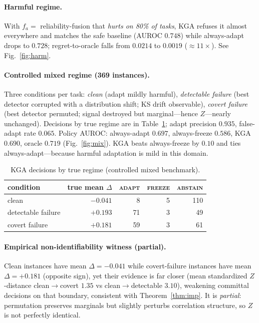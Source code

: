 \documentclass[conference]{IEEEtran}
\theoremstyle{plain}
\theoremstyle{definition}
\begin{document}
\paragraph{Harmful regime.} With $f_a=$ reliability-fusion that \emph{hurts on 80\% of
tasks}, \textsc{KGA} refuses it almost everywhere and matches the safe baseline
(AUROC $0.748$) while always-adapt drops to $0.728$; regret-to-oracle falls from
$0.0214$ to $0.0019$ ($\approx11\times$). See Fig.~\ref{fig:harm}.

\paragraph{Controlled mixed regime (369 instances).} Three conditions per task:
\emph{clean} (adapt mildly harmful), \emph{detectable failure} (best detector
corrupted with a distribution shift; KS drift observable), \emph{covert failure} (best
detector permuted; signal destroyed but marginal---hence $Z$---nearly unchanged).
Decisions by true regime are in Table~\ref{tab:mixed}; adapt precision $0.935$,
false-adapt rate $0.065$. Policy AUROC: always-adapt $0.697$, always-freeze $0.586$,
\textsc{KGA} $0.690$, oracle $0.719$ (Fig.~\ref{fig:mix}). \textsc{KGA} beats
always-freeze by $0.10$ and ties always-adapt---because harmful adaptation is mild in
this domain.

\begin{table}[t]\centering
\begin{tabular}{lrrrr}
\toprule
condition & true mean $\Delta$ & \textsc{adapt} & \textsc{freeze} & \textsc{abstain}\\
\midrule
clean & $-0.041$ & 8 & 5 & 110\\
detectable failure & $+0.193$ & 71 & 3 & 49\\
covert failure & $+0.181$ & 59 & 3 & 61\\
\bottomrule
\end{tabular}
\caption{\textsc{KGA} decisions by true regime (controlled mixed benchmark).}
\label{tab:mixed}
\end{table}

\paragraph{Empirical non-identifiability witness (partial).} Clean instances have mean
$\Delta=-0.041$ while covert-failure instances have mean $\Delta=+0.181$ (opposite
sign), yet their evidence is far closer (mean standardized $Z$-distance clean$\to$covert
$1.35$ vs clean$\to$detectable $3.10$), weakening committal decisions on that boundary,
consistent with Theorem~\ref{thm:imp}. It is \emph{partial}: permutation preserves
marginals but slightly perturbs correlation structure, so $Z$ is not perfectly identical.
\end{document}

